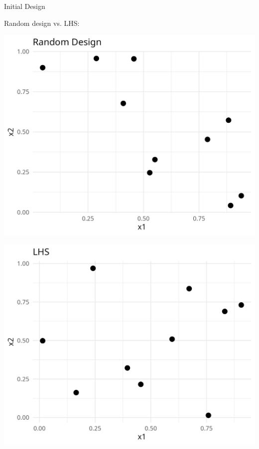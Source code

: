 \documentclass[11pt,compress,t,notes=noshow, xcolor=table]{beamer}
\begin{document}
\begin{frame}{Initial Design}

Random design vs. LHS:

\vspace{+0.45cm}

\begin{minipage}[b]{0.45\textwidth}
  \includegraphics[width = \textwidth]{slides/010-bayesian-optimization/figure_man/init_0.png}
\end{minipage}
\hfill
\begin{minipage}[b]{0.45\textwidth}
  \includegraphics[width = \textwidth]{slides/010-bayesian-optimization/figure_man/init_1.png}
\end{minipage}

\end{frame}
\end{document}
